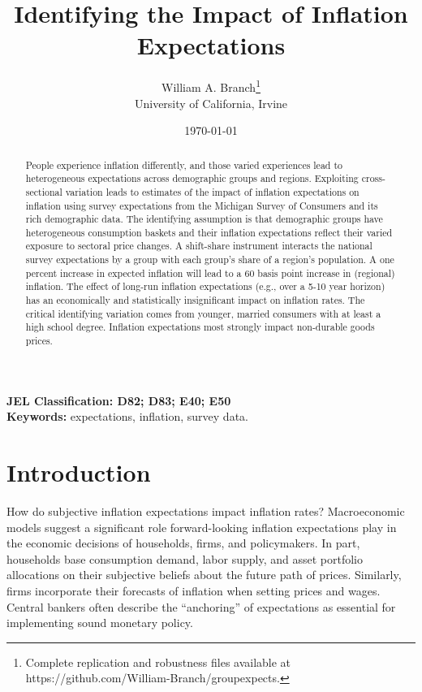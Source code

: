 \documentclass[12pt]{article}
\begin{document}
\title{\vspace{-1 in} Identifying the Impact of Inflation Expectations}
\author{William A. Branch\thanks{Complete replication and robustness files available at https://github.com/William-Branch/groupexpects.} \\
University of California, Irvine }
\date{\today}
\maketitle
\vspace{-0.45in}

\begin{abstract}

People experience inflation differently, and those varied experiences lead to heterogeneous expectations across demographic groups and regions. Exploiting cross-sectional variation leads to estimates of the impact of inflation expectations on inflation using survey expectations from the Michigan Survey of Consumers and its rich demographic data. The identifying assumption is that demographic groups have heterogeneous consumption baskets and their inflation expectations reflect their varied exposure to sectoral price changes. A shift-share instrument interacts the national survey expectations by a group with each group's share of a region's population. A one percent increase in expected inflation will lead to a 60 basis point increase in (regional) inflation. The effect of long-run inflation expectations (e.g., over a 5-10 year horizon) has an economically and statistically insignificant impact on inflation rates. The critical identifying variation comes from younger, married consumers with at least a high school degree. Inflation expectations most strongly impact non-durable goods prices.
\end{abstract}

\textbf{JEL Classification: D82; D83; E40; E50}\\

\textbf{Keywords:} expectations, inflation, survey data.

\section{Introduction}

How do subjective inflation expectations impact inflation rates? Macroeconomic models suggest a significant role forward-looking inflation expectations play in the economic decisions of households, firms, and policymakers. In part, households base consumption demand, labor supply, and asset portfolio allocations on their subjective beliefs about the future path of prices. Similarly, firms incorporate their forecasts of inflation when setting prices and wages. Central bankers often describe the ``anchoring'' of expectations as essential for implementing sound monetary policy.  
\end{document}
